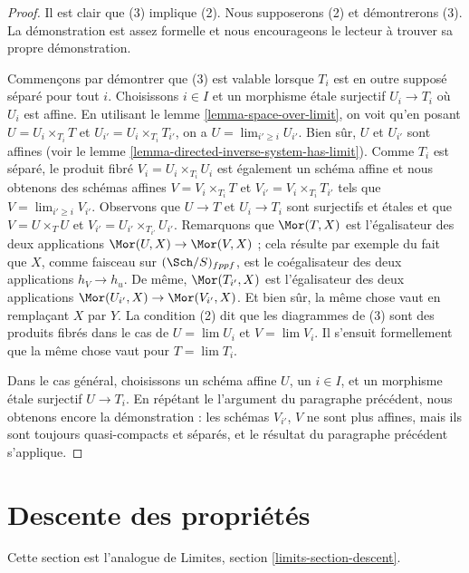 \begin{proof}
Il est clair que (3) implique (2). Nous supposerons (2) et démontrerons (3).
La démonstration est assez formelle et nous encourageons le lecteur à trouver
sa propre démonstration.

\medskip\noindent
Commençons par démontrer que (3) est valable
lorsque $T_i$ est en outre supposé séparé pour tout $i$.
Choisissons $i \in I$ et un morphisme \'etale surjectif $U_i \to T_i$
où $U_i$ est affine. En utilisant le lemme \ref{lemma-space-over-limit},
on voit qu'en posant $U = U_i \times_{T_i} T$ et
$U_{i'} = U_i \times_{T_i} T_{i'}$, on a $U = \lim_{i' \geq i} U_{i'}$.
Bien sûr, $U$ et $U_{i'}$ sont affines (voir
le lemme \ref{lemma-directed-inverse-system-has-limit}).
Comme $T_i$ est séparé, le produit fibré $V_i = U_i \times_{T_i} U_i$
est également un schéma affine et nous obtenons des schémas affines
$V = V_i \times_{T_i} T$ et
$V_{i'} = V_i \times_{T_i} T_{i'}$ tels que $V = \lim_{i' \geq i} V_{i'}$.
Observons que $U \to T$ et $U_i \to T_i$ sont surjectifs et \'etales
et que $V = U \times_T U$ et $V_{i'} = U_{i'} \times_{T_{i'}} U_{i'}$.
Remarquons que $\Mor(T, X)$ est l'égalisateur des deux applications
$\Mor(U, X) \to \Mor(V, X)$ ; cela résulte par exemple du fait que
$X$, comme faisceau sur $(\Sch/S)_{fppf}$, est le coégalisateur
des deux applications $h_V \to h_u$. De même,
$\Mor(T_{i'}, X)$ est l'égalisateur des
deux applications $\Mor(U_{i'}, X) \to \Mor(V_{i'}, X)$.
Et bien sûr, la même chose vaut en remplaçant $X$ par $Y$.
La condition (2) dit que les diagrammes de (3) sont des produits fibrés
dans le cas de $U = \lim U_i$ et $V = \lim V_i$.
Il s'ensuit formellement que la même chose vaut pour $T = \lim T_i$.

\medskip\noindent
Dans le cas général, choisissons un schéma affine $U$, un $i \in I$,
et un morphisme \'etale surjectif $U \to T_i$. En répétant le
l'argument du paragraphe précédent, nous obtenons encore la démonstration :
les schémas $V_{i'}$, $V$ ne sont plus affines, mais ils sont
toujours quasi-compacts et
séparés, et le résultat du paragraphe précédent s'applique.
\end{proof}




\section{Descente des propriétés}
\label{section-descent}

\noindent
Cette section est l'analogue de Limites, section \ref{limits-section-descent}.

